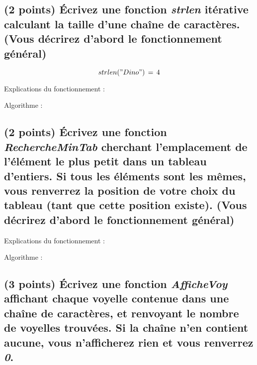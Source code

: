 \documentclass[11pt,a4paper]{article}
\begin{document}
\smallskip


\clearpage


\subsection{(2 points) \'Ecrivez une fonction \og \textit{strlen} \fg{} itérative calculant la taille d'une chaîne de caractères. (Vous décrirez d'abord le fonctionnement général) }

\vspace*{-0.5cm}

\begin{center}

\begin{equation*}
strlen("Dino")  \, = \,  4
\end{equation*}

Explications du fonctionnement :

\bigskip

Algorithme :

\bigskip

\end{center}


\smallskip


\clearpage


\subsection{(2 points) \'Ecrivez une fonction \og \textit{RechercheMinTab} \fg{} cherchant l'emplacement de l'élément le plus petit dans un tableau d'entiers. Si tous les éléments sont les mêmes, vous renverrez la position de votre choix du tableau (tant que cette position existe). (Vous décrirez d'abord le fonctionnement général) }


\begin{center}
Explications du fonctionnement :

Algorithme :

\bigskip

\end{center}


\clearpage


\subsection{(3 points) \'Ecrivez une fonction \og \textit{AfficheVoy} \fg{} affichant chaque voyelle contenue dans une chaîne de caractères, et renvoyant le nombre de voyelles trouvées. Si la chaîne n'en contient aucune, vous n'afficherez rien et vous renverrez \textit{0}. }
\end{document}
